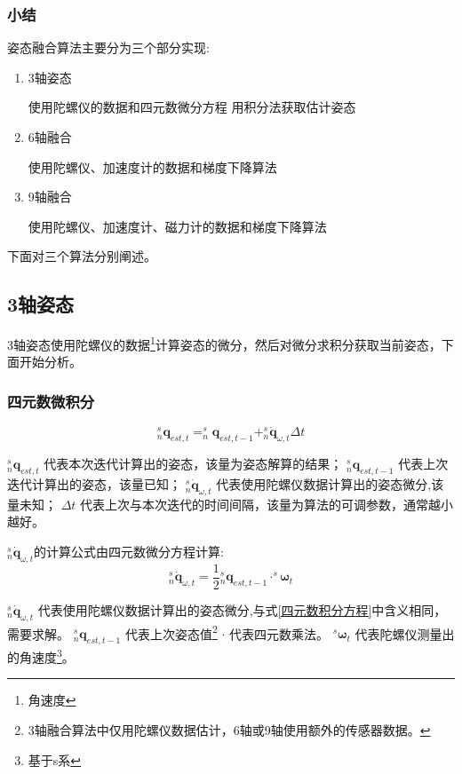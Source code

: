 \documentclass[12pt,a4paper]{article}
\begin{document}
\subsubsection{小结}
姿态融合算法主要分为三个部分实现:
\begin{enumerate}
    \item 3轴姿态

        使用陀螺仪的数据和四元数微分方程 用积分法获取估计姿态
    \item 6轴融合

        使用陀螺仪、加速度计的数据和梯度下降算法
    \item 9轴融合

        使用陀螺仪、加速度计、磁力计的数据和梯度下降算法
\end{enumerate}

下面对三个算法分别阐述。
\subsection{3轴姿态}
3轴姿态使用陀螺仪的数据\footnote{角速度}计算姿态的微分，然后对微分求积分获取当前姿态，下面开始分析。
\subsubsection{四元数微积分}
\begin{equation}\label{四元数积分方程}
    ^s_n\bm{q}_{est,t}=^s_n\bm{q}_{est,t-1}+^s_n\dot{{\bm{q}}}_{\omega,t} \Delta t
\end{equation} 

$^s_n\bm{q}_{est,t}$            代表本次迭代计算出的姿态，该量为姿态解算的结果；
$^s_n\bm{q}_{est,t-1}$          代表上次迭代计算出的姿态，该量已知；
$^s_n\dot{{\bm{q}}}_{\omega,t}$ 代表使用陀螺仪数据计算出的姿态微分,该量未知；
$\Delta t$                      代表上次与本次迭代的时间间隔，该量为算法的可调参数，通常越小越好。

$^s_n\dot{{\bm{q}}}_{\omega,t}$的计算公式由四元数微分方程计算:
\begin{equation}\label{四元数微分方程}
    ^s_n\dot{{\bm{q}}}_{\omega,t}=\frac{1}{2}{^s_n\bm{q}_{est,t-1}}\cdot^s{\bm{\omega}}_t
\end{equation} 

$^s_n\dot{{\bm{q}}}_{\omega,t}$ 代表使用陀螺仪数据计算出的姿态微分,与式\ref{四元数积分方程}中含义相同，需要求解。
$^s_n\bm{q}_{est,t-1}$          代表上次姿态值\footnote{3轴融合算法中仅用陀螺仪数据估计，6轴或9轴使用额外的传感器数据。}
$\cdot$                         代表四元数乘法。
$^s\bm{\omega}_t$               代表陀螺仪测量出的角速度\footnote{基于s系}。
\end{document}
